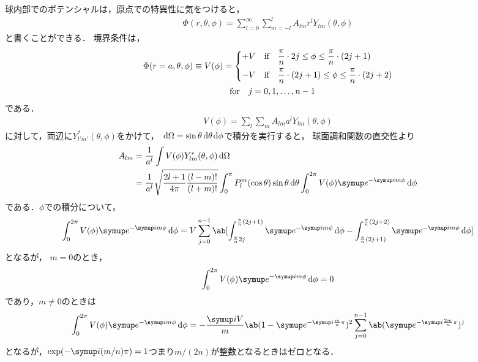   球内部でのポテンシャルは，原点での特異性に気をつけると，
  \begin{gather}%
    \label{eq:3-4_eq1}
    \Phi(r,\theta,\phi) = \sum_{l=0}^\infty \sum_{m=-l}^{l} A_{lm}r^l Y_{lm}(\theta,\phi)
  \end{gather}%
  と書くことができる．
  境界条件は，
  \begin{multline}%
    \Phi(r=a,\theta,\phi) \equiv V(\phi)=
    \begin{dcases}%
      +V \qqtext{if} \frac{\pi}{n} \cdot 2j \leq \phi \leq \frac{\pi}{n}\cdot(2j+1)\\
      -V \qqtext{if} \frac{\pi}{n}\cdot(2j+1) \leq \phi \leq \frac{\pi}{n}\cdot (2j+2)
    \end{dcases}\\%
    \qqtext{for} j = 0, 1, \ldots, n-1
  \end{multline}%
  である．
  \begin{gather}%
    V(\phi) = \sum_{l} \sum_{m} A_{lm} a^l Y_{lm}(\theta,\phi)
  \end{gather}%
  に対して，両辺に$Y^*_{l'm'}(\theta,\phi)$をかけて，
  $\dl{\Omega} = \sin\theta\dl{\theta,\phi}$で積分を実行すると，
  球面調和関数の直交性より
  \begin{align}%
    A_{lm} &= \frac{1}{a^l} \int V(\phi) Y^*_{lm}(\theta,\phi) \dl{\Omega}\notag\\
    &= \frac{1}{a^l} \sqrt{\frac{2l+1}{4\pi}\frac{(l-m)!}{(l+m)!}}\int_0^\pi
    P_{l}^m(\cos\theta)\sin\theta\dl{\theta} \int_0^{2\pi} V(\phi) \e^{-\i m\phi}\dl{\phi}
  \end{align}%
  である．$\phi$での積分について，
  \begin{gather}
    \int_0^{2\pi} V(\phi) \e^{-\i m\phi} \dl{\phi} = V \sum_{j=0}^{n-1} \ab[
      \int_{\frac{\pi}{n}2j}^{\frac{\pi}{n}(2j+1)} \e^{-\i m\phi}\dl{\phi}
      - \int_{\frac{\pi}{n}(2j+1)}^{\frac{\pi}{n}(2j+2)} \e^{-\i m\phi}\dl{\phi}
    ]
  \end{gather}
  となるが， $m = 0$のとき，
  \begin{gather}%
    \int_0^{2\pi} V(\phi)\e^{-\i m\phi} \dl{\phi} =  0
  \end{gather}%
  であり，$m \neq 0$のときは
  \begin{gather}%
    \int_0^{2\pi} V(\phi) \e^{-\i m\phi} \dl{\phi} =
    - \frac{\i V}{m} \ab(1-\e^{-\i \frac{m}{n}\pi})^2 \sum_{j=0}^{n-1}\ab(\e^{-\i \frac{2m}{n}\pi})^j
  \end{gather}%
  となるが，$\exp(-\i (m/n)\pi) = 1$つまり$m/(2n)$が整数となるときはゼロとなる．
